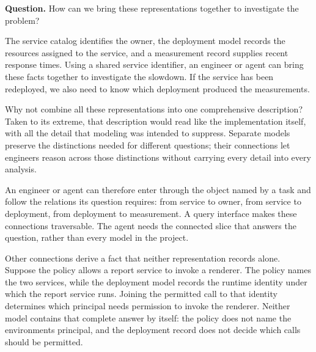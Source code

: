 \textbf{Question.} How can we bring these representations together to investigate the problem?


The service catalog identifies the owner, the deployment model records the resources assigned to the service, and a measurement record supplies recent response times. Using a shared service identifier, an engineer or agent can bring these facts together to investigate the slowdown. If the service has been redeployed, we also need to know which deployment produced the measurements.


Why not combine all these representations into one comprehensive description? Taken to its extreme, that description would read like the implementation itself, with all the detail that modeling was intended to suppress. Separate models preserve the distinctions needed for different questions; their connections let engineers reason across those distinctions without carrying every detail into every analysis.


An engineer or agent can therefore enter through the object named by a task and follow the relations its question requires: from service to owner, from service to deployment, from deployment to measurement. A query interface makes these connections traversable. The agent needs the connected slice that answers the question, rather than every model in the project.


Other connections derive a fact that neither representation records alone. Suppose the policy allows a report service to invoke a renderer. The policy names the two services, while the deployment model records the runtime identity under which the report service runs. Joining the permitted call to that identity determines which principal needs permission to invoke the renderer. Neither model contains that complete answer by itself: the policy does not name the environment\textquotesingle s principal, and the deployment record does not decide which calls should be permitted.

